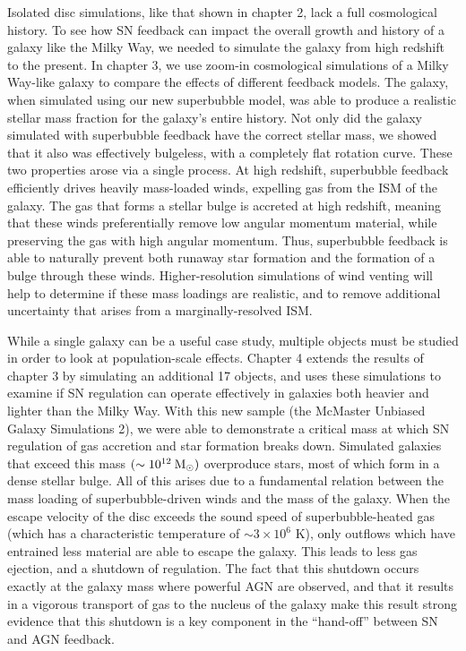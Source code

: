 Isolated disc simulations, like that shown in chapter 2, lack a full
cosmological history.  To see how SN feedback can impact the overall growth and
history of a galaxy like the Milky Way, we needed to simulate the galaxy from
high redshift to the present.  In chapter 3, we use zoom-in cosmological
simulations \citep{Navarro1993} of a Milky Way-like galaxy to compare the
effects of different feedback models.  The galaxy, when simulated using our new
superbubble model, was able to produce a realistic stellar mass fraction for the
galaxy's entire history.  Not only did the galaxy simulated with superbubble
feedback have the correct stellar mass, we showed that it also was effectively
bulgeless, with a completely flat rotation curve.  These two properties arose
via a single process.  At high redshift, superbubble feedback efficiently drives
heavily mass-loaded winds, expelling gas from the ISM of the galaxy.  The gas
that forms a stellar bulge is accreted at high redshift, meaning that these
winds preferentially remove low angular momentum material, while preserving the
gas with high angular momentum.  Thus, superbubble feedback is able to naturally
prevent both runaway star formation and the formation of a bulge through these
winds.  Higher-resolution simulations of wind venting will help to determine if
these mass loadings are realistic, and to remove additional uncertainty that
arises from a marginally-resolved ISM.  

While a single galaxy can be a useful case study, multiple objects must be
studied in order to look at population-scale effects.  Chapter 4 extends the
results of chapter 3 by simulating an additional 17 objects, and uses these
simulations to examine if SN regulation can operate effectively in galaxies both
heavier and lighter than the Milky Way.  With this new sample (the McMaster
Unbiased Galaxy Simulations 2), we were able to demonstrate a critical mass at
which SN regulation of gas accretion and star formation breaks down.  Simulated
galaxies that exceed this mass $(\sim 10^{12}\>{\rm M_{\odot}})$ overproduce stars,  most
of which form in a dense stellar bulge.  All of this arises due to a fundamental
relation between the mass loading of superbubble-driven winds and the mass of
the galaxy.  When the escape velocity of the disc exceeds the sound speed of
superbubble-heated gas (which has a characteristic temperature of
$\sim3\times10^6$ K), only outflows which have entrained less material are able
to escape the galaxy. This leads to less gas ejection, and a shutdown of
regulation.  The fact that this shutdown occurs exactly at the galaxy mass where
powerful AGN are observed, and that it results in a vigorous transport of gas to
the nucleus of the galaxy make this result strong evidence that this shutdown
is a key component in the ``hand-off'' between SN and AGN feedback.

